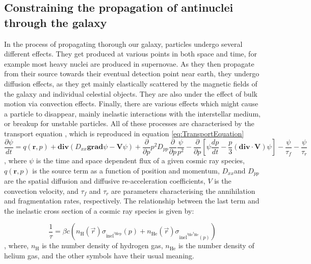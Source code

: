 \subsection{Constraining the propagation of antinuclei through the galaxy}\label{sec:Propagation}
In the process of propagating thorough our galaxy, particles undergo several different effects. They get produced at various points in both space and time, for example most heavy nuclei are produced in supernovae. As they then propagate from their source towards their eventual detection point near earth, they undergo diffusion effects, as they get mainly elastically scattered by the magnetic fields of the galaxy and individual celestial objects. They are also under the effect of bulk motion via convection effects. Finally, there are various effects which might cause a particle to disappear, mainly inelastic interactions with the interstellar medium, or breakup for unstable particles. All of these processes are characterised by the transport equation \cite{}, which is reproduced in equation \ref{eq:TransportEquation}
\begin{equation}
    \label{eq:TransportEquation}
    \frac{\partial\psi}{dt} = q(\textbf{r},p) + \mathrm{\textbf{div}}(D_{xx}\mathrm{\textbf{grad}}\psi - \textbf{V}\psi) + \frac{\partial}{\partial p}p^2D_{pp} \frac{\partial}{\partial p}\frac{\psi}{p^2} - \frac{\partial}{\partial p} \left[ \psi \frac{dp}{d t}   -\frac{p}{3} (\mathrm{\textbf{div}}\cdot  \mathrm{\textbf{V}} )\psi              \right] - \frac{\psi}{\tau_f}-\frac{\psi}{\tau_r}
\end{equation}
, where $\psi$ is the time and space dependent flux of a given cosmic ray species, $q(\textbf{r},p)$ is the source term as a function of position and momentum, $D_{xx}$and $D_{pp}$ are the spatial diffusion and diffusive re-acceleration coefficients, $V$ is the convection velocity, and $\tau_f$ and $\tau_r$ are parameters characterising the annihilation and fragmentation rates, respectively. The relationship between the last term and the inelastic cross section of a cosmic ray species is given by: 

\begin{equation}\label{eq:annihilation_lossTerm_relation}
    \frac{1}{\tau} = \beta c \left( n_\mathrm{H}(\vec{r})\sigma_{\mathrm{inel}^{^3\mathrm{\overline{He}p}}} (p) + n_{\mathrm{He}}(\vec{r})\sigma_{\mathrm{inel}^{^3\mathrm{\overline{He}^4He}} (p)} 
    \right)
\end{equation},
where, $n_\mathrm{H}$ is the number density of hydrogen gas, $n_\mathrm{He}$ is the number density of helium gas, and the other symbols have their usual meaning.\\

